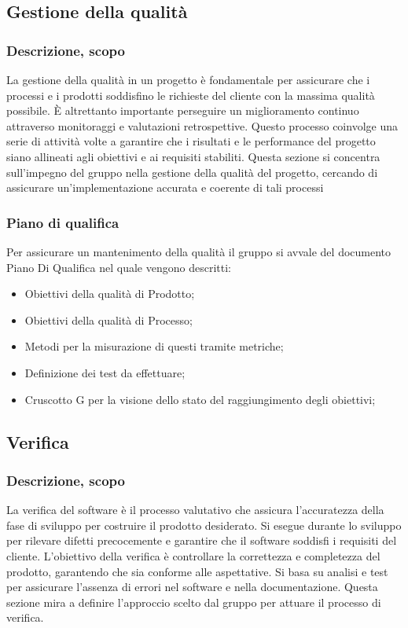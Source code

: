 \documentclass{article}
\begin{document}
\subsection{Gestione della qualità}
    \subsubsection{Descrizione, scopo}
    La gestione della qualità in un progetto è fondamentale per assicurare che i processi e i prodotti soddisfino le richieste del cliente con la massima qualità possibile. È altrettanto importante perseguire un miglioramento continuo attraverso monitoraggi e valutazioni retrospettive. Questo processo coinvolge una serie di attività volte a garantire che i risultati e le performance del progetto siano allineati agli obiettivi e ai requisiti stabiliti. Questa sezione si concentra sull'impegno del gruppo nella gestione della qualità del progetto, cercando di assicurare un'implementazione accurata e coerente di tali processi
    \subsubsection{Piano di qualifica}
    Per assicurare un mantenimento della qualità il gruppo si avvale del documento Piano Di Qualifica nel quale vengono descritti:
    \begin{itemize}
		\item Obiettivi della qualità di Prodotto;
		\item Obiettivi della qualità di Processo;
		\item Metodi per la misurazione di questi tramite metriche;
		\item Definizione dei test da effettuare;
		\item Cruscotto G per la visione dello stato del raggiungimento degli obiettivi;
    \end{itemize}

\subsection{Verifica}
    \subsubsection{Descrizione, scopo}
    La verifica del software è il processo valutativo che assicura l'accuratezza della fase di sviluppo per costruire il prodotto desiderato. Si esegue durante lo sviluppo per rilevare difetti precocemente e garantire che il software soddisfi i requisiti del cliente. L'obiettivo della verifica è controllare la correttezza e completezza del prodotto, garantendo che sia conforme alle aspettative. Si basa su analisi e test per assicurare l'assenza di errori nel software e nella documentazione. Questa sezione mira a definire l'approccio scelto dal gruppo per attuare il processo di verifica.
\end{document}
